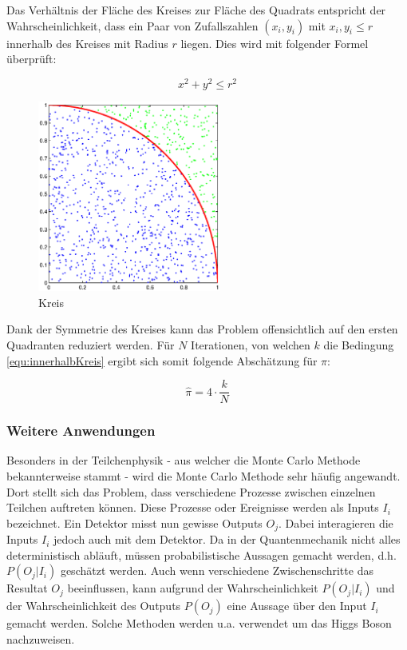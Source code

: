 \documentclass{book}
\begin{document}
\begin{refsection}
Das Verhältnis der Fläche des Kreises zur Fläche des Quadrats
entspricht der Wahrscheinlichkeit, dass ein Paar von Zufallszahlen $(x_i,y_i)$ mit $x_i,y_i \leq r$ innerhalb des Kreises mit Radius $r$ liegen. Dies wird mit folgender Formel überprüft:

\begin{equation}
	x^2 + y^2 \leq r^2
	\label{equ:innerhalbKreis}
\end{equation}

\begin{figure}[htbp]
	\centering
	\includegraphics[width=6cm]{images/kreis_hitmiss.eps}
	\caption{Kreis}
	\label{fig:KreisHitMiss}
\end{figure}

Dank der Symmetrie des Kreises kann das Problem offensichtlich auf den ersten Quadranten reduziert werden. Für $N$ Iterationen, von welchen $k$ die Bedingung \ref{equ:innerhalbKreis} ergibt sich somit folgende Abschätzung für $\pi$:

\begin{equation}
	\hat{\pi} = 4 \cdot \frac{k}{N}
\end{equation}


\subsubsection{Weitere Anwendungen}
Besonders in der Teilchenphysik - aus welcher die Monte Carlo Methode bekannterweise stammt - wird die Monte Carlo Methode sehr häufig angewandt. Dort stellt sich das Problem, dass verschiedene Prozesse zwischen einzelnen Teilchen auftreten können. Diese Prozesse oder Ereignisse werden als Inputs $I_i$ bezeichnet. Ein Detektor misst nun gewisse Outputs $O_j$. Dabei interagieren die Inputs $I_i$ jedoch auch mit dem Detektor. Da in der Quantenmechanik nicht alles deterministisch abläuft, müssen probabilistische Aussagen gemacht werden, d.h. $P(O_j | I_i)$ geschätzt werden. Auch wenn verschiedene Zwischenschritte das Resultat $O_j$ beeinflussen, kann aufgrund der Wahrscheinlichkeit $P(O_j | I_i)$ und der Wahrscheinlichkeit des Outputs $P(O_j)$ eine Aussage über den Input $I_i$ gemacht werden. Solche Methoden werden u.a. verwendet um das Higgs Boson nachzuweisen. 


\end{refsection}
\end{document}
